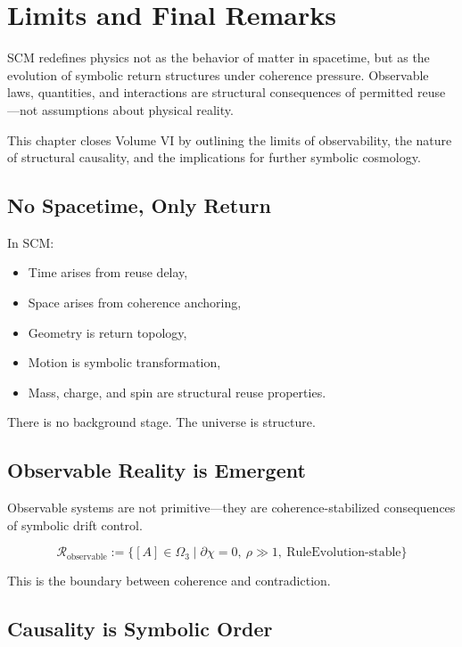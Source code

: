 \chapter{Limits and Final Remarks} \label{chapter-final-remarks}

SCM redefines physics not as the behavior of matter in spacetime, but as the evolution of symbolic return structures under coherence pressure. Observable laws, quantities, and interactions are structural consequences of permitted reuse—not assumptions about physical reality.

This chapter closes Volume VI by outlining the limits of observability, the nature of structural causality, and the implications for further symbolic cosmology.

\section{No Spacetime, Only Return} \label{sec:no-spacetime}

In SCM:
\begin{itemize}
  \item Time arises from reuse delay,
  \item Space arises from coherence anchoring,
  \item Geometry is return topology,
  \item Motion is symbolic transformation,
  \item Mass, charge, and spin are structural reuse properties.
\end{itemize}

There is no background stage. The universe is structure.

\section{Observable Reality is Emergent} \label{sec:reality-emergent}

Observable systems are not primitive—they are coherence-stabilized consequences of symbolic drift control.

\[
\mathcal{R}_{\text{observable}} := \{ [A] \in \Omega_3 \mid \partial\chi = 0,\ \rho \gg 1,\ \text{RuleEvolution-stable} \}
\]

This is the boundary between coherence and contradiction.

\section{Causality is Symbolic Order} \label{sec:causality}

